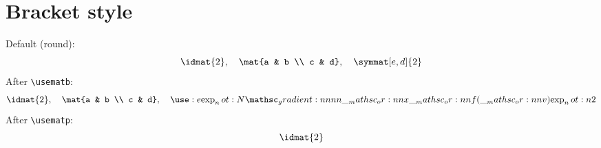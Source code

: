 \documentclass{article}
\begin{document}
\section*{Bracket style}
Default (round): \[ \idmat{2}, \quad \mat{a & b \\ c & d}, \quad \symmat[e,d]{2} \]
\usematb
After \verb|\usematb|: \[ \idmat{2}, \quad \mat{a & b \\ c & d}, \quad \gradient{2} \]
\usematp
After \verb|\usematp|: \[ \idmat{2} \]
\end{document}
